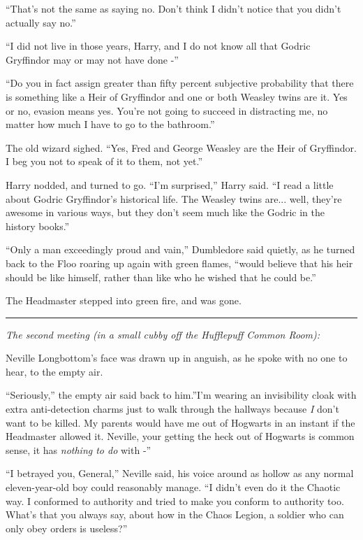 ``That's not the same as saying no. Don't think I didn't notice that you
didn't actually say no.''

``I did not live in those years, Harry, and I do not know all that
Godric Gryffindor may or may not have done -''

``Do you in fact assign greater than fifty percent subjective
probability that there is something like a Heir of Gryffindor and one or
both Weasley twins are it. Yes or no, evasion means yes. You're not
going to succeed in distracting me, no matter how much I have to go to
the bathroom.''

The old wizard sighed. ``Yes, Fred and George Weasley are the Heir of
Gryffindor. I beg you not to speak of it to them, not yet.''

Harry nodded, and turned to go. ``I'm surprised,'' Harry said. ``I read
a little about Godric Gryffindor's historical life. The Weasley twins
are... well, they're awesome in various ways, but they don't seem
much like the Godric in the history books.''

``Only a man exceedingly proud and vain,'' Dumbledore said quietly, as
he turned back to the Floo roaring up again with green flames, ``would
believe that his heir should be like himself, rather than like who he
wished that he could be.''

The Headmaster stepped into green fire, and was gone.

\begin{center}\rule{3in}{0.4pt}\end{center}

\emph{The second meeting (in a small cubby off the Hufflepuff Common
Room):}

Neville Longbottom's face was drawn up in anguish, as he spoke with no
one to hear, to the empty air.

``Seriously,'' the empty air said back to him.''I'm wearing an
invisibility cloak with extra anti-detection charms just to walk through
the hallways because \emph{I} don't want to be killed. My parents would
have me out of Hogwarts in an instant if the Headmaster allowed it.
Neville, your getting the heck out of Hogwarts is common sense, it has
\emph{nothing to do} with -''

``I betrayed you, General,'' Neville said, his voice around as hollow as
any normal eleven-year-old boy could reasonably manage. ``I didn't even
do it the Chaotic way. I conformed to authority and tried to make you
conform to authority too. What's that you always say, about how in the
Chaos Legion, a soldier who can only obey orders is useless?''

